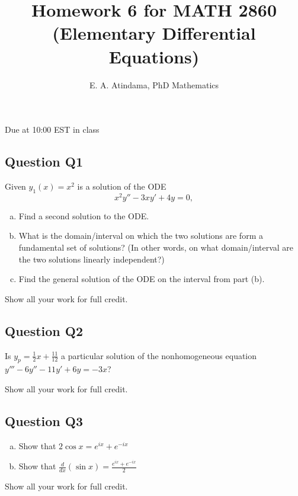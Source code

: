 \documentclass[a4paper,11pt,reqno]{amsart}
\title[MATH 2860 (Elementary Differential Equations)]{Homework 6 for MATH 2860 (Elementary Differential Equations)}
\author[Emmanuel Atindama]{E. A. Atindama, PhD Mathematics}
\numberwithin{equation}{section}
\begin{document}
\maketitle

Due at 10:00 EST in class

\subsection*{Question Q1}
  Given $y_1(x)=x^2$ is a solution of the ODE
  \[
  x^2y'' - 3xy' + 4y = 0,
  \]
  \begin{enumerate}[(a)]
    \item Find a second solution to the ODE.
    \item What is the domain/interval on which the two solutions are form a fundamental set of solutions? 
    (In other words, on what domain/interval are the two solutions linearly independent?)
    \item Find the general solution of the ODE on the interval from part (b).
  \end{enumerate}
  \textcolor{red!70}{Show all your work for full credit.}
  
  \vspace{1cm}



\subsection*{Question Q2}
  Is \(y_p = \frac{1}{2}x + \frac{11}{12}\) a particular solution of the nonhomogeneous equation \(y''' - 6y'' - 11y' + 6y= -3x\)?
  
  \textcolor{red!70}{Show all your work for full credit.}
  \vspace{1cm}


  
\subsection*{Question Q3}
  \begin{enumerate}[(a)]
    \item Show that \(2\cos{x} = e^{ix} + e^{-ix}\)
    \item Show that \(\frac{d}{dx}(\sin{x}) = \frac{e^{ix} + e^{-ix}}{2}\)
  \end{enumerate}
  \textcolor{red!70}{Show all your work for full credit.}
  
\end{document}
